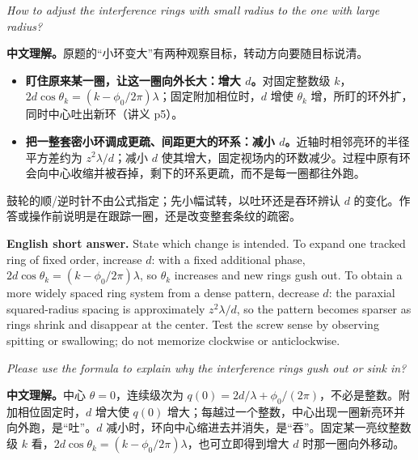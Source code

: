 \documentclass[11pt]{ctexart}
\begin{document}

\textit{How to adjust the interference rings with small radius to the one with large radius?}

\textbf{中文理解。}原题的“小环变大”有两种观察目标，转动方向要随目标说清。
\begin{itemize}
\item \textbf{盯住原来某一圈，让这一圈向外长大：增大 \(d\)。}对固定整数级 \(k\)，\(2d\cos\theta_k=(k-\phi_0/2\pi)\lambda\)；固定附加相位时，\(d\) 增使 \(\theta_k\) 增，所盯的环外扩，同时中心吐出新环（讲义 p5）。
\item \textbf{把一整套密小环调成更疏、间距更大的环系：减小 \(d\)。}近轴时相邻亮环的半径平方差约为 \(z^2\lambda/d\)；减小 \(d\) 使其增大，固定视场内的环数减少。过程中原有环会向中心收缩并被吞掉，剩下的环系更疏，而不是每一圈都往外跑。
\end{itemize}
鼓轮的顺/逆时针不由公式指定；先小幅试转，以吐环还是吞环辨认 \(d\) 的变化。作答或操作前说明是在跟踪一圈，还是改变整套条纹的疏密。

\textbf{English short answer.} State which change is intended. To expand one tracked ring of fixed order, increase \(d\): with a fixed additional phase, \(2d\cos\theta_k=(k-\phi_0/2\pi)\lambda\), so \(\theta_k\) increases and new rings gush out. To obtain a more widely spaced ring system from a dense pattern, decrease \(d\): the paraxial squared-radius spacing is approximately \(z^2\lambda/d\), so the pattern becomes sparser as rings shrink and disappear at the center. Test the screw sense by observing spitting or swallowing; do not memorize clockwise or anticlockwise.



\textit{Please use the formula to explain why the interference rings gush out or sink in?}

\textbf{中文理解。}中心 \(\theta=0\)，连续级次为 \(q(0)=2d/\lambda+\phi_0/(2\pi)\)，不必是整数。附加相位固定时，\(d\) 增大使 \(q(0)\) 增大；每越过一个整数，中心出现一圈新亮环并向外跑，是“吐”。\(d\) 减小时，环向中心缩进去并消失，是“吞”。固定某一亮纹整数级 \(k\) 看，\(2d\cos\theta_k=(k-\phi_0/2\pi)\lambda\)，也可立即得到增大 \(d\) 时那一圈向外移动。
\end{document}
